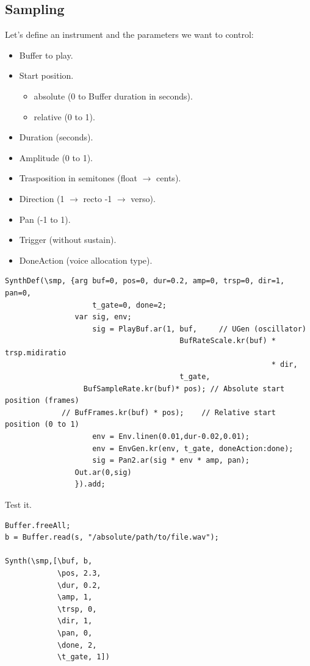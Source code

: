 \subsection{Sampling }\label{sampling}

Let's define an instrument and the parameters we want to control:

\begin{itemize}
\tightlist
\item Buffer to play.
\item Start position.

  \begin{itemize}
  \tightlist
  \item absolute (0 to Buffer duration in seconds).
  \item relative (0 to 1).
  \end{itemize}
\item Duration (seconds).
\item Amplitude (0 to 1).
\item Trasposition in semitones (float \(\rightarrow\) cents).
\item Direction (1 \(\rightarrow\) recto -1 \(\rightarrow\) verso).
\item Pan (-1 to 1).
\item Trigger (without sustain).
\item DoneAction (voice allocation type).
\end{itemize}

\begin{lstlisting}[frame=single] 
SynthDef(\smp, {arg buf=0, pos=0, dur=0.2, amp=0, trsp=0, dir=1, pan=0, 
                    t_gate=0, done=2;
                var sig, env;
                    sig = PlayBuf.ar(1, buf,     // UGen (oscillator)
                                        BufRateScale.kr(buf) * trsp.midiratio 
                                                             * dir,           
                                        t_gate,                                
		          BufSampleRate.kr(buf)* pos); // Absolute start position (frames) 
	         // BufFrames.kr(buf) * pos);    // Relative start position (0 to 1)
                    env = Env.linen(0.01,dur-0.02,0.01);                  
                    env = EnvGen.kr(env, t_gate, doneAction:done);
                    sig = Pan2.ar(sig * env * amp, pan);
                Out.ar(0,sig)
                }).add;
\end{lstlisting}

Test it.

\begin{lstlisting}[frame=single] 
Buffer.freeAll;
b = Buffer.read(s, "/absolute/path/to/file.wav");

Synth(\smp,[\buf, b, 
            \pos, 2.3, 
            \dur, 0.2, 
            \amp, 1, 
            \trsp, 0, 
            \dir, 1, 
            \pan, 0, 
            \done, 2, 
            \t_gate, 1])
\end{lstlisting}

